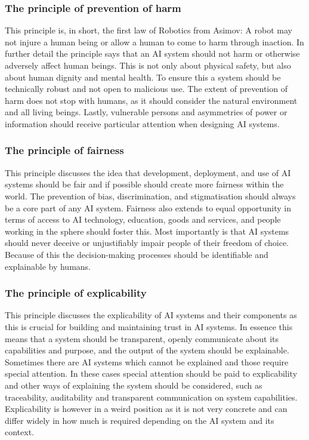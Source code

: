 \subsubsection*{The principle of prevention of harm}
This principle is, in short, the first law of Robotics from Asimov: A robot may not injure a human being or allow a human to come to harm through inaction. In further detail the principle says that an AI system should not harm or otherwise adversely affect human beings. This is not only about physical safety, but also about human dignity and mental health. To ensure this a system should be technically robust and not open to malicious use. The extent of prevention of harm does not stop with humans, as it should consider the natural environment and all living beings. Lastly, vulnerable persons and asymmetries of power or information should receive particular attention when designing AI systems.

\subsubsection*{The principle of fairness}
This principle discusses the idea that development, deployment, and use of AI systems should be fair and if possible should create more fairness within the world. The prevention of bias, discrimination, and stigmatisation should always be a core part of any AI system. Fairness also extends to equal opportunity in terms of access to AI technology, education, goods and services, and people working in the sphere should foster this. Most importantly is that AI systems should never deceive or unjustifiably impair people of their freedom of choice. Because of this the decision-making processes should be identifiable and explainable by humans.

\subsubsection*{The principle of explicability}
This principle discusses the explicability of AI systems and their components as this is crucial for building and maintaining trust in AI systems. In essence this means that a system should be transparent, openly communicate about its capabilities and purpose, and the output of the system should be explainable. Sometimes there are AI systems which cannot be explained and those require special attention. In these cases special attention should be paid to explicability and other ways of explaining the system should be considered, such as traceability, auditability and transparent communication on system capabilities. Explicability is however in a weird position as it is not very concrete and can differ widely in how much is required depending on the AI system and its context.


